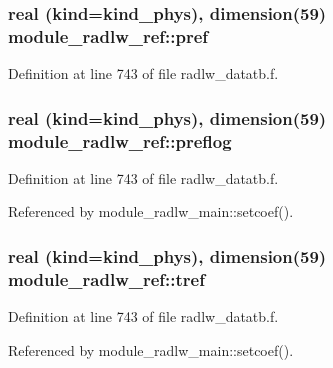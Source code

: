 \subsubsection[{\texorpdfstring{pref}{pref}}]{\setlength{\rightskip}{0pt plus 5cm}real (kind=kind\+\_\+phys), dimension(59) module\+\_\+radlw\+\_\+ref\+::pref}\hypertarget{namespacemodule__radlw__ref_adda97d9a274bef59507633a3fc5a0e78}{}\label{namespacemodule__radlw__ref_adda97d9a274bef59507633a3fc5a0e78}


Definition at line 743 of file radlw\+\_\+datatb.\+f.

\subsubsection[{\texorpdfstring{preflog}{preflog}}]{\setlength{\rightskip}{0pt plus 5cm}real (kind=kind\+\_\+phys), dimension(59) module\+\_\+radlw\+\_\+ref\+::preflog}\hypertarget{namespacemodule__radlw__ref_a4206f7320b6f1b59eb0132326263d2e4}{}\label{namespacemodule__radlw__ref_a4206f7320b6f1b59eb0132326263d2e4}


Definition at line 743 of file radlw\+\_\+datatb.\+f.



Referenced by module\+\_\+radlw\+\_\+main\+::setcoef().

\subsubsection[{\texorpdfstring{tref}{tref}}]{\setlength{\rightskip}{0pt plus 5cm}real (kind=kind\+\_\+phys), dimension(59) module\+\_\+radlw\+\_\+ref\+::tref}\hypertarget{namespacemodule__radlw__ref_a56972f3948052e8b7f4717c192fc551d}{}\label{namespacemodule__radlw__ref_a56972f3948052e8b7f4717c192fc551d}


Definition at line 743 of file radlw\+\_\+datatb.\+f.



Referenced by module\+\_\+radlw\+\_\+main\+::setcoef().

